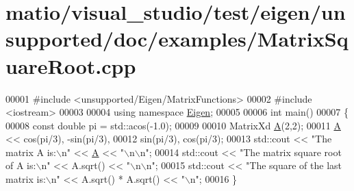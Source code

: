 \hypertarget{matio_2visual__studio_2test_2eigen_2unsupported_2doc_2examples_2_matrix_square_root_8cpp_source}{}\section{matio/visual\+\_\+studio/test/eigen/unsupported/doc/examples/\+Matrix\+Square\+Root.cpp}
\label{matio_2visual__studio_2test_2eigen_2unsupported_2doc_2examples_2_matrix_square_root_8cpp_source}

\begin{DoxyCode}
00001 \textcolor{preprocessor}{#include <unsupported/Eigen/MatrixFunctions>}
00002 \textcolor{preprocessor}{#include <iostream>}
00003 
00004 \textcolor{keyword}{using namespace }\hyperlink{namespace_eigen}{Eigen};
00005 
00006 \textcolor{keywordtype}{int} main()
00007 \{
00008   \textcolor{keyword}{const} \textcolor{keywordtype}{double} pi = std::acos(-1.0);
00009 
00010   MatrixXd \hyperlink{group___core___module_class_eigen_1_1_matrix}{A}(2,2);
00011   \hyperlink{group___core___module_class_eigen_1_1_matrix}{A} << cos(pi/3), -sin(pi/3), 
00012        sin(pi/3),  cos(pi/3);
00013   std::cout << \textcolor{stringliteral}{"The matrix A is:\(\backslash\)n"} << \hyperlink{group___core___module_class_eigen_1_1_matrix}{A} << \textcolor{stringliteral}{"\(\backslash\)n\(\backslash\)n"};
00014   std::cout << \textcolor{stringliteral}{"The matrix square root of A is:\(\backslash\)n"} << A.sqrt() << \textcolor{stringliteral}{"\(\backslash\)n\(\backslash\)n"};
00015   std::cout << \textcolor{stringliteral}{"The square of the last matrix is:\(\backslash\)n"} << A.sqrt() * A.sqrt() << \textcolor{stringliteral}{"\(\backslash\)n"};
00016 \}
\end{DoxyCode}
